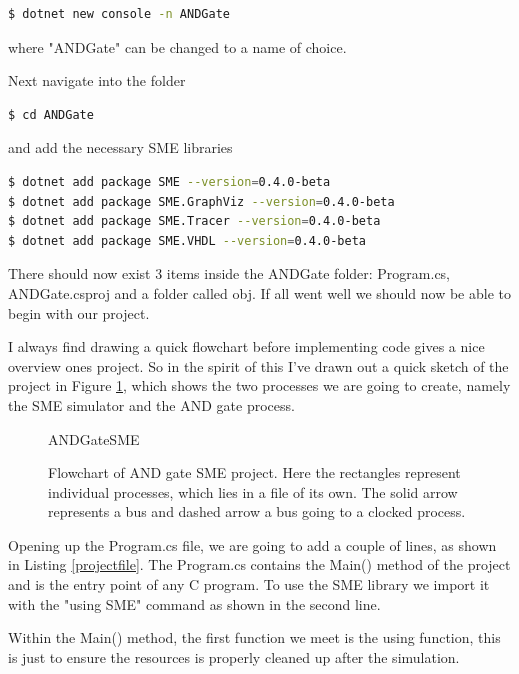         \begin{lstlisting}[language=bash]
$ dotnet new console -n ANDGate
        \end{lstlisting}
        where "ANDGate" can be changed to a name of choice.
        
        Next navigate into the folder
        \begin{lstlisting}[language=bash]
$ cd ANDGate 
        \end{lstlisting}
        and add the necessary SME libraries
        \begin{lstlisting}[language=bash]
$ dotnet add package SME --version=0.4.0-beta
$ dotnet add package SME.GraphViz --version=0.4.0-beta
$ dotnet add package SME.Tracer --version=0.4.0-beta
$ dotnet add package SME.VHDL --version=0.4.0-beta
        \end{lstlisting}
        
        There should now exist 3 items inside the ANDGate folder: Program.cs, ANDGate.csproj and a folder called obj. If all went well we should now be able to begin with our project.
        
        I always find drawing a quick flowchart before implementing code gives a nice overview ones project. So in the spirit of this I've drawn out a quick sketch of the project in Figure \ref{fig:ANDGateSME}, which shows the two processes we are going to create, namely the SME simulator and the AND gate process.
        
        \begin{figure}[h!]
            \centering
            {ANDGateSME}
            \caption{Flowchart of AND gate SME project. Here the rectangles represent individual processes, which lies in a file of its own. The solid arrow represents a bus and dashed arrow a bus going to a clocked process.}
            \label{fig:ANDGateSME}
        \end{figure}  
        
        
\newpage
        Opening up the Program.cs file, we are going to add a couple of lines, as shown in Listing \ref{projectfile}. The Program.cs contains the Main() method of the project and is the entry point of any C program. To use the SME library we import it with the "using SME" command as shown in the second line. 
        
        Within the Main() method, the first function we meet is the using function, this is just to ensure the resources is properly cleaned up after the simulation.
        
